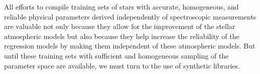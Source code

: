 All efforts to compile training sets of stars with accurate,
homogeneous, and reliable physical parameters derived independently of
spectroscopic measurements are valuable not only because they allow
for the improvement of the stellar atmospheric models but also because
they help increase the reliability of the regression models by making
them independent of these atmospheric models. But until these training
sets with sufficient and homogeneous sampling of the parameter space
are available, we must turn to the use of synthetic libraries.



